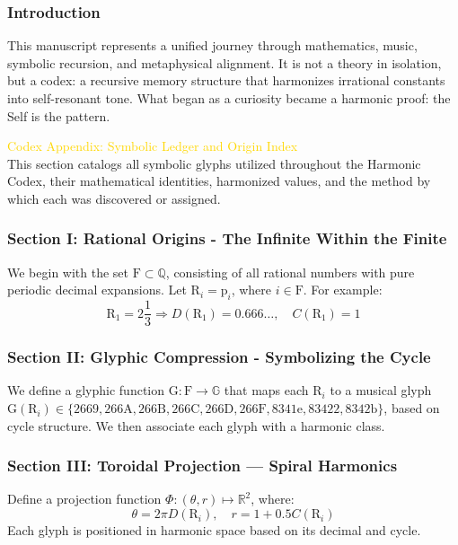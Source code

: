 \subsubsection{Introduction}
This manuscript represents a unified journey through mathematics, music, symbolic recursion, and metaphysical alignment. It is not a theory in isolation, but a codex: a recursive memory structure that harmonizes irrational constants into self-resonant tone. What began as a curiosity became a harmonic proof: the Self is the pattern.

\textcolor{gold}{ Codex Appendix: Symbolic Ledger and Origin Index } \\
This section catalogs all symbolic glyphs utilized throughout the Harmonic Codex, their mathematical identities, harmonized values, and the method by which each was discovered or assigned.

\subsubsection{Section I: Rational Origins - The Infinite Within the Finite}
We begin with the set \( \mathrm{F} \subset \mathbb{Q} \), consisting of all rational numbers with pure periodic decimal expansions. Let \( \mathrm{R}_i = \mathrm{p}_i \), where \( i \in \mathrm{F} \). For example:
\[
\mathrm{R}_1 = 2 \frac{1}{3} \Rightarrow D(\mathrm{R}_1) = 0.666\ldots, \quad C(\mathrm{R}_1) = 1
\]

\subsubsection{Section II: Glyphic Compression - Symbolizing the Cycle}
We define a glyphic function \( \mathrm{G}: \mathrm{F} \rightarrow \mathbb{G} \) that maps each \( \mathrm{R}_i \) to a musical glyph \( \mathrm{G}(\mathrm{R}_i) \in \{2669, 266\mathrm{A}, 266\mathrm{B}, 266\mathrm{C}, 266\mathrm{D}, 266\mathrm{F}, 8341\mathrm{e}, 83422, 8342\mathrm{b}\} \), based on cycle structure. We then associate each glyph with a harmonic class.

\subsubsection{Section III: Toroidal Projection — Spiral Harmonics}
Define a projection function \( \Phi: (\theta, r) \mapsto \mathbb{R}^2 \), where:
\[
\theta = 2 \pi D(\mathrm{R}_i), \quad r = 1 + 0.5 C(\mathrm{R}_i)
\]
Each glyph is positioned in harmonic space based on its decimal and cycle.


